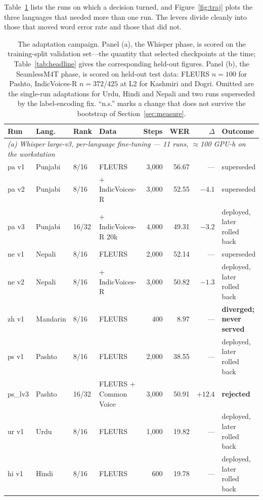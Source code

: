 \documentclass[sigconf,anonymous,review]{acmart}
\begin{document}
Table~\ref{tab:runs} lists the runs on which a decision turned, and
Figure~\ref{fig:traj} plots the three languages that needed more than one run. The
levers divide cleanly into those that moved word error rate and those that did
not.

\begin{table}[t]
\caption{The adaptation campaign. Panel (a), the Whisper phase, is scored on the
training-split validation set---the quantity that selected checkpoints at the
time; Table~\ref{tab:headline} gives the corresponding held-out figures. Panel
(b), the SeamlessM4T phase, is scored on held-out test data: FLEURS $n=100$ for
Pashto, IndicVoices-R $n=372$/$425$ at L2 for Kashmiri and Dogri. Omitted are
the single-run adaptations for Urdu, Hindi and Nepali and two runs superseded by
the label-encoding fix. ``n.s.'' marks a change that does not survive the
bootstrap of Section~\ref{sec:measure}.}
\label{tab:runs}
\footnotesize
\begin{tabular}{llllrrrl}
\toprule
Run & Lang. & Rank & Data & Steps & WER & $\Delta$ & Outcome \\
\midrule
\multicolumn{8}{l}{\emph{(a) Whisper large-v3, per-language fine-tuning --- 11 runs, $\approx$100 GPU-h on the workstation}}\\
\midrule
pa v1 & Punjabi  & 8/16  & FLEURS               & 3{,}000 & 56.67 & ---   & superseded \\
pa v2 & Punjabi  & 8/16  & + IndicVoices-R      & 3{,}000 & 52.55 & $-4.1$ & superseded \\
pa v3 & Punjabi  & 16/32 & + IndicVoices-R 20k  & 4{,}000 & 49.31 & $-3.2$ & deployed, later rolled back \\
ne v1 & Nepali   & 8/16  & FLEURS               & 2{,}000 & 52.14 & ---   & superseded \\
ne v2 & Nepali   & 8/16  & + IndicVoices-R      & 3{,}000 & 50.82 & $-1.3$ & deployed, later rolled back \\
zh v1 & Mandarin & 8/16  & FLEURS               & 400     & 8.97  & ---   & \textbf{diverged; never served} \\
ps v1 & Pashto   & 8/16  & FLEURS               & 2{,}000 & 38.55 & ---   & deployed, later rolled back \\
ps\_lv3 & Pashto & 16/32 & FLEURS + Common Voice & 3{,}000 & 50.91 & $+12.4$ & \textbf{rejected} \\
ur v1 & Urdu     & 8/16  & FLEURS               & 1{,}000 & 19.82 & ---   & deployed, later rolled back \\
hi v1 & Hindi    & 8/16  & FLEURS               & 600     & 19.78 & ---   & deployed, later rolled back \\

\end{tabular}
\end{table}
\end{document}
